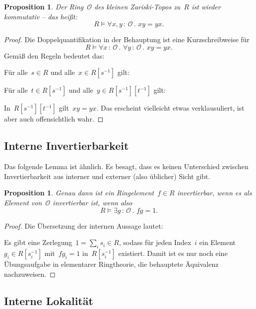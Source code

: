 \documentclass[a4paper,ngerman,12pt]{scrartcl}
\theoremstyle{definition}
\theoremstyle{plain}
\newtheorem{prop}[defn]{Proposition}
\theoremstyle{remark}
\renewcommand{\O}{\mathcal{O}}
\renewcommand{\_}{\mathpunct{.}\,}
\newcommand{\?}{\,{:}\,}
\newenvironment{indentblock}{%
  \list{}{\leftmargin\leftmargin}%
  \item\relax
}{%
  \endlist
}
\begin{document}
\begin{prop}Der Ring~$\O$ des kleinen Zariski-Topos zu~$R$ ist wieder
kommutativ -- das heißt:
\[ R \models \forall x,y \? \O\_ x y = y x. \]
\end{prop}
\begin{proof}Die Doppelquantifikation in der Behauptung ist eine
Kurzschreibweise für
\[ R \models \forall x\?\O\_ \forall y\?\O\_ x y = y x. \]
Gemäß den Regeln bedeutet das:
\begin{indentblock}
Für alle~$s \in R$ und alle~$x \in R[s^{-1}]$ gilt:
\begin{indentblock}
Für alle~$t \in R[s^{-1}]$ und alle~$y \in R[s^{-1}][t^{-1}]$ gilt:
\begin{indentblock}
In~$R[s^{-1}][t^{-1}]$ gilt~$xy = yx$.
\end{indentblock}
\end{indentblock}
\end{indentblock}
Das erscheint vielleicht etwas verklausuliert, ist aber auch offensichtlich
wahr.
\end{proof}


\subsection{Interne Invertierbarkeit}

Das folgende Lemma ist ähnlich. Es besagt, dass es keinen Unterschied zwischen
Invertierbarkeit aus interner und externer (also üblicher) Sicht gibt.
\begin{prop}\label{interne-invertierbarkeit}%
Genau dann ist ein Ringelement~$f \in R$ invertierbar, wenn es als Element
von~$\O$ invertierbar ist, wenn also
\[ R \models \exists g\?\O\_ fg = 1. \]
\end{prop}
\begin{proof}
Die Übersetzung der internen Aussage lautet:
\begin{indentblock}
Es gibt eine Zerlegung~$1 = \sum_i s_i \in R$, sodass für jeden Index~$i$ ein
Element~$g_i \in R[s_i^{-1}]$ mit~$fg_i = 1$ in~$R[s_i^{-1}]$ existiert.
\end{indentblock}
Damit ist es nur noch eine Übungsaufgabe in elementarer Ringtheorie, die
behauptete Äquivalenz nachzuweisen.
\end{proof}


\subsection{Interne Lokalität}
\end{document}
